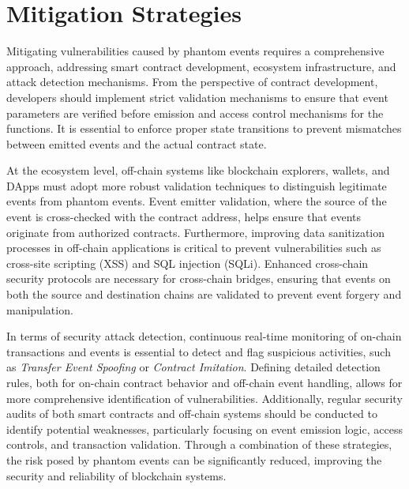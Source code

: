 \label{sec:related}


\section{Mitigation Strategies}
\label{sec:mitigation}

Mitigating vulnerabilities caused by phantom events requires a comprehensive approach, addressing smart contract development, ecosystem infrastructure, and attack detection mechanisms. From the perspective of contract development, developers should implement strict validation mechanisms to ensure that event parameters are verified before emission and access control mechanisms for the functions. It is essential to enforce proper state transitions to prevent mismatches between emitted events and the actual contract state. 

At the ecosystem level, off-chain systems like blockchain explorers, wallets, and DApps must adopt more robust validation techniques to distinguish legitimate events from phantom events. Event emitter validation, where the source of the event is cross-checked with the contract address, helps ensure that events originate from authorized contracts. Furthermore, improving data sanitization processes in off-chain applications is critical to prevent vulnerabilities such as cross-site scripting (XSS) and SQL injection (SQLi). Enhanced cross-chain security protocols are necessary for cross-chain bridges, ensuring that events on both the source and destination chains are validated to prevent event forgery and manipulation.

In terms of security attack detection, continuous real-time monitoring of on-chain transactions and events is essential to detect and flag suspicious activities, such as \emph{Transfer Event Spoofing} or \emph{Contract Imitation}. Defining detailed detection rules, both for on-chain contract behavior and off-chain event handling, allows for more comprehensive identification of vulnerabilities. Additionally, regular security audits of both smart contracts and off-chain systems should be conducted to identify potential weaknesses, particularly focusing on event emission logic, access controls, and transaction validation. Through a combination of these strategies, the risk posed by phantom events can be significantly reduced, improving the security and reliability of blockchain systems.



